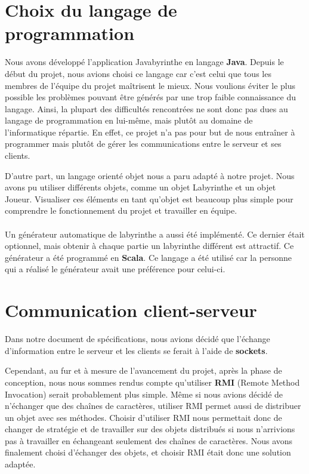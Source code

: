 \section{Choix du langage de programmation}

	Nous avons développé l'application Javabyrinthe en langage \textbf{Java}. Depuis le début du projet, nous avions choisi ce langage car c'est celui que tous les membres de l'équipe du projet maîtrisent le mieux. Nous voulions éviter le plus possible les problèmes pouvant être générés par une trop faible connaissance du langage. Ainsi, la plupart des difficultés rencontrées ne sont donc pas dues au langage de programmation en lui-même, mais plutôt au domaine de l'informatique répartie. En effet, ce projet n'a pas pour but de nous entraîner à programmer mais plutôt de gérer les communications entre le serveur et ses clients.

	D'autre part, un langage orienté objet nous a paru adapté à notre projet. Nous avons pu utiliser différents objets, comme un objet Labyrinthe et un objet Joueur. Visualiser ces éléments en tant qu'objet est beaucoup plus simple pour comprendre le fonctionnement du projet et travailler en équipe.

	\paragraph*{}
	Un générateur automatique de labyrinthe a aussi été implémenté. Ce dernier était optionnel, mais obtenir à chaque partie un labyrinthe différent est attractif. Ce générateur a été programmé en \textbf{Scala}. Ce langage a été utilisé car la personne qui a réalisé le générateur avait une préférence pour celui-ci.


\section{Communication client-serveur}

	Dans notre document de spécifications, nous avions décidé que l'échange d'information entre le serveur et les clients se ferait à l'aide de \textbf{sockets}.

	Cependant, au fur et à mesure de l'avancement du projet, après la phase de conception, nous nous sommes rendus compte qu'utiliser \textbf{RMI} (Remote Method Invocation) serait probablement plus simple. Même si nous avions décidé de n'échanger que des chaînes de caractères, utiliser RMI permet aussi de distribuer un objet avec ses méthodes. Choisir d'utiliser RMI nous permettait donc de changer de stratégie et de travailler sur des objets distribués si nous n'arrivions pas à travailler en échangeant seulement des chaînes de caractères. Nous avons finalement choisi d'échanger des objets, et choisir RMI était donc une solution adaptée.

